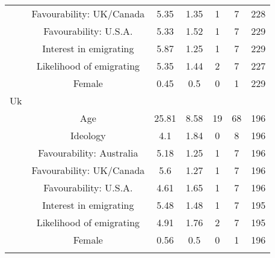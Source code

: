\begin{table}[!htbp]
\begin{tabular}{@{\extracolsep{5pt}} ccccccc}
 & Favourability: UK/Canada & 5.35 & 1.35 & 1 & 7 & 228 \\ 
 & Favourability: U.S.A. & 5.33 & 1.52 & 1 & 7 & 229 \\ 
 & Interest in emigrating & 5.87 & 1.25 & 1 & 7 & 229 \\ 
 & Likelihood of emigrating & 5.35 & 1.44 & 2 & 7 & 227 \\ 
 & Female & 0.45 & 0.5 & 0 & 1 & 229 \\ 
Uk &  &  &  &  &  &  \\ 
 & Age & 25.81 & 8.58 & 19 & 68 & 196 \\ 
 & Ideology & 4.1 & 1.84 & 0 & 8 & 196 \\ 
 & Favourability: Australia & 5.18 & 1.25 & 1 & 7 & 196 \\ 
 & Favourability: UK/Canada & 5.6 & 1.27 & 1 & 7 & 196 \\ 
 & Favourability: U.S.A. & 4.61 & 1.65 & 1 & 7 & 196 \\ 
 & Interest in emigrating & 5.48 & 1.48 & 1 & 7 & 195 \\ 
 & Likelihood of emigrating & 4.91 & 1.76 & 2 & 7 & 195 \\ 
 & Female & 0.56 & 0.5 & 0 & 1 & 196 \\ 
\hline \\[-1.8ex] 
\end{tabular} 
\end{table} 

